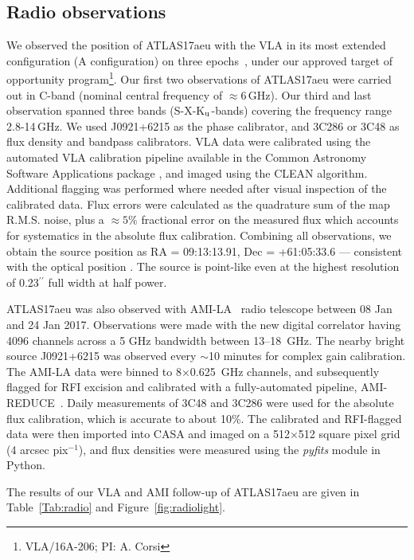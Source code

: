 \documentclass[twocolumn]{aastex6}
\begin{document}
\subsection{Radio observations}\label{subsec:radio}
We observed the position of ATLAS17aeu with the VLA in its most extended configuration (A configuration) on three epochs~\citep{GW170104_VLA}, under our approved target of opportunity program\footnote{VLA/16A-206; PI: A. Corsi}. Our first two observations of ATLAS17aeu were carried out in C-band (nominal central frequency of $\approx 6$\,GHz). Our third and last observation spanned three bands (S-X-K$_{\rm u}$-bands) covering the frequency range 2.8-14\,GHz. We used J0921+6215 as the phase calibrator, and 3C286 or 3C48 as flux density and bandpass calibrators. VLA data were calibrated using the automated VLA calibration pipeline available in the Common Astronomy Software Applications package \citep[CASA;][]{McMullin2007}, and imaged using the CLEAN algorithm. Additional flagging was performed where needed after visual inspection of the calibrated data. Flux errors were calculated as the quadrature sum of the map R.M.S. noise, plus a $\approx 5\%$ fractional error on the measured flux which accounts for systematics in the absolute flux calibration. Combining all observations, we obtain the source position as RA = 09:13:13.91, Dec = +61:05:33.6 --- consistent with the optical position \citep[RA = 09:13:13.89, Dec = +61:05:33.6;][]{GW170104_ATLAS}. The source is point-like even at the highest resolution of 0.23$^{\prime\prime}$ full width at half power.  

ATLAS17aeu was also observed with AMI-LA~\citep{zbb+08} radio telescope between 08 Jan and 24 Jan 2017. Observations were made with the new digital correlator having 4096 channels across a 5 GHz bandwidth between 13--18~GHz. The nearby bright source J0921+6215 was observed every $\sim$10 minutes for complex gain calibration. The AMI-LA data were binned to 8$\times$0.625~GHz channels, and subsequently flagged for RFI excision and calibrated with a fully-automated pipeline, AMI-REDUCE~\citep[cf.][]{dtd+09,psg+13}. Daily measurements of 3C48 and 3C286 were used for the absolute flux calibration, which is accurate to about 10\%. The calibrated and RFI-flagged data were then imported into CASA and imaged on a 512$\times$512 square pixel grid (4 arcsec pix$^{-1}$), and  flux densities were measured using the {\it pyfits} module in Python.

The results of our VLA and AMI follow-up of ATLAS17aeu are given in Table~\ref{Tab:radio} and Figure~\ref{fig:radiolight}.
\end{document}
